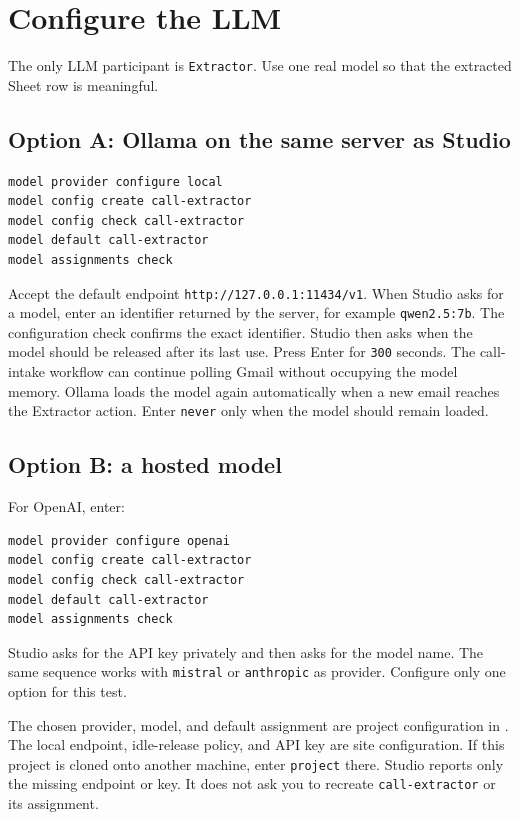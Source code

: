 \documentclass[11pt,a4paper]{article}
\begin{document}
\section{Configure the LLM}

The only LLM participant is \texttt{Extractor}. Use one real model so that
the extracted Sheet row is meaningful.

\subsection{Option A: Ollama on the same server as Studio}

\begin{lstlisting}[style=shell]
model provider configure local
model config create call-extractor
model config check call-extractor
model default call-extractor
model assignments check
\end{lstlisting}

Accept the default endpoint
\texttt{http://127.0.0.1:11434/v1}. When Studio asks for a model, enter an
identifier returned by the server, for example \texttt{qwen2.5:7b}. The
configuration check confirms the exact identifier. Studio then asks when the
model should be released after its last use. Press Enter for \texttt{300}
seconds. The call-intake workflow can continue polling Gmail without occupying
the model memory. Ollama loads the model again automatically when a new email
reaches the Extractor action. Enter \texttt{never} only when the model should
remain loaded.

\subsection{Option B: a hosted model}

For OpenAI, enter:

\begin{lstlisting}[style=shell]
model provider configure openai
model config create call-extractor
model config check call-extractor
model default call-extractor
model assignments check
\end{lstlisting}

Studio asks for the API key privately and then asks for the model name. The
same sequence works with \texttt{mistral} or \texttt{anthropic} as provider.
Configure only one option for this test.

The chosen provider, model, and default assignment are project configuration
in . The local endpoint, idle-release policy, and API key
are site configuration. If this project is cloned onto another machine, enter
\texttt{project} there. Studio reports only the missing endpoint or key. It
does not ask you to recreate \texttt{call-extractor} or its assignment.
\end{document}
